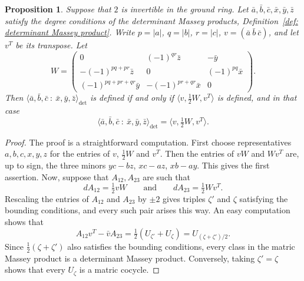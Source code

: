 \documentclass[11pt]{article}
\newtheorem{proposition}[theorem]{Proposition}
\theoremstyle{definition}
\theoremstyle{definition}
\begin{document}
\begin{proposition}
\label{prop: connection to matric Massey products}
Suppose that $2$ is invertible in the ground ring. 
Let $\bar a,\bar b,\bar c,\bar x,\bar y,\bar z$ satisfy the degree conditions of 
the determinant Massey products, Definition~\ref{def: determinant Massey product}.
Write $p=|a|$, $q=|b|$, $r=|c|$, $v=(\bar a\ \bar b\ \bar c)$, and let $v^{T}$ be its transpose.
Let 
\begin{equation*} 
W = \begin{pmatrix} 0 & (-1)^{qr}\bar z & -\bar y \\
-(-1)^{pq+pr}\bar z & 0 & (-1)^{pq}\bar x \\ 
(-1)^{pq+pr+qr}\bar y & -(-1)^{pr+qr}\bar x & 0
\end{pmatrix}. 
\end{equation*} 
Then $\langle \bar a,\bar b,\bar c \ : \ \bar x, \bar y, \bar z\rangle_{\det}$ is defined if 
and only if $\langle v, \frac{1}{2}W,v^{T}\rangle$ is defined,
and in that case 
\begin{equation*} 
\langle \bar a,\bar b,\bar c \ : \ \bar x, \bar y, \bar z\rangle_{\det} = \langle v, \tfrac{1}{2}W,v^{T}\rangle. 
\end{equation*} 
\end{proposition}



\begin{proof} 
The proof is a straightforward computation.
First choose representatives $a,b,c,x,y,z$ for the entries of $v$, $\tfrac{1}{2}W$ and $v^T$.
Then the entries of $vW$ and $Wv^T$ are, up to sign, the three minors $yc-bz$, $xc-az$, $xb-ay$.
This gives the first assertion.
Now, suppose that $A_{12}, A_{23}$ are such that 
\begin{equation*}
dA_{12}=\tfrac{1}{2} vW \qquad \textrm{and} \qquad dA_{23}=\tfrac{1}{2} W v^T.
\end{equation*}
Rescaling the entries of $A_{12}$ and $A_{23}$ by $\pm2$ gives triples $\zeta'$ and $\zeta$ satisfying the bounding conditions,
and every such pair arises this way.
An easy computation shows that
\begin{equation*}
A_{12}v^T-\bar vA_{23}=\tfrac12(U_{\zeta'}+U_\zeta)=U_{(\zeta+\zeta')/2}.
\end{equation*}
Since $\tfrac12(\zeta+\zeta')$ also satisfies the bounding conditions, every class in the matric Massey product
is a determinant Massey product. Conversely, taking $\zeta'=\zeta$ shows that every $U_\zeta$ is a matric cocycle.
\end{proof}
\end{document}
